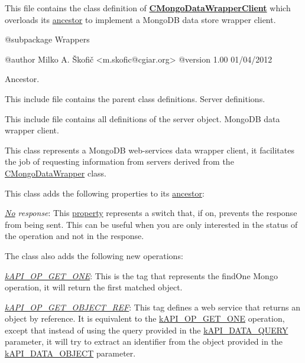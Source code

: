 This file contains the class definition of {\bfseries \hyperlink{class_c_mongo_data_wrapper_client}{C\-Mongo\-Data\-Wrapper\-Client}} which overloads its \hyperlink{class_c_data_wrapper_client}{ancestor} to implement a Mongo\-D\-B data store wrapper client.

\begin{DoxyVerb} @subpackage        Wrappers

 @author            Milko A. Škofič <m.skofic@cgiar.org>
 @version   1.00 01/04/2012\end{DoxyVerb}


Ancestor.

This include file contains the parent class definitions. Server definitions.

This include file contains all definitions of the server object. Mongo\-D\-B data wrapper client.

This class represents a Mongo\-D\-B web-\/services data wrapper client, it facilitates the job of requesting information from servers derived from the \hyperlink{class_c_mongo_data_wrapper}{C\-Mongo\-Data\-Wrapper} class.

This class adds the following properties to its \hyperlink{class_c_wrapper_client}{ancestor}\-:


\begin{DoxyItemize}
\item {\itshape \hyperlink{}{No} response}\-: This \hyperlink{}{property} represents a switch that, if on, prevents the response from being sent. This can be useful when you are only interested in the status of the operation and not in the response. 
\end{DoxyItemize}

The class also adds the following new operations\-:


\begin{DoxyItemize}
\item {\itshape \hyperlink{}{k\-A\-P\-I\-\_\-\-O\-P\-\_\-\-G\-E\-T\-\_\-\-O\-N\-E}}\-: This is the tag that represents the find\-One Mongo operation, it will return the first matched object. 
\item {\itshape \hyperlink{}{k\-A\-P\-I\-\_\-\-O\-P\-\_\-\-G\-E\-T\-\_\-\-O\-B\-J\-E\-C\-T\-\_\-\-R\-E\-F}}\-: This tag defines a web service that returns an object by reference. It is equivalent to the \hyperlink{}{k\-A\-P\-I\-\_\-\-O\-P\-\_\-\-G\-E\-T\-\_\-\-O\-N\-E} operation, except that instead of using the query provided in the \hyperlink{}{k\-A\-P\-I\-\_\-\-D\-A\-T\-A\-\_\-\-Q\-U\-E\-R\-Y} parameter, it will try to extract an identifier from the object provided in the \hyperlink{}{k\-A\-P\-I\-\_\-\-D\-A\-T\-A\-\_\-\-O\-B\-J\-E\-C\-T} parameter. 
\end{DoxyItemize}

